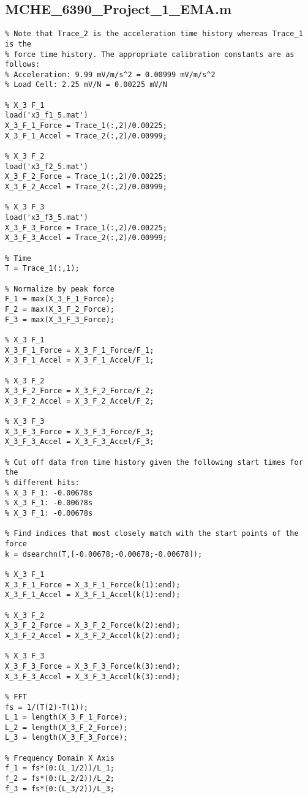 \documentclass{article}
\begin{document}
\subsection*{MCHE\_6390\_Project\_1\_EMA.m}
\begin{lstlisting}[style=Matlab-editor]
% Load data and apply proper calibration constants
% Note that Trace_2 is the acceleration time history whereas Trace_1 is the
% force time history. The appropriate calibration constants are as follows:
% Acceleration: 9.99 mV/m/s^2 = 0.00999 mV/m/s^2
% Load Cell: 2.25 mV/N = 0.00225 mV/N

% X_3 F_1
load('x3_f1_5.mat')
X_3_F_1_Force = Trace_1(:,2)/0.00225;
X_3_F_1_Accel = Trace_2(:,2)/0.00999;

% X_3 F_2
load('x3_f2_5.mat')
X_3_F_2_Force = Trace_1(:,2)/0.00225;
X_3_F_2_Accel = Trace_2(:,2)/0.00999;

% X_3 F_3
load('x3_f3_5.mat')
X_3_F_3_Force = Trace_1(:,2)/0.00225;
X_3_F_3_Accel = Trace_2(:,2)/0.00999;

% Time
T = Trace_1(:,1);

% Normalize by peak force
F_1 = max(X_3_F_1_Force);
F_2 = max(X_3_F_2_Force);
F_3 = max(X_3_F_3_Force);

% X_3 F_1
X_3_F_1_Force = X_3_F_1_Force/F_1;
X_3_F_1_Accel = X_3_F_1_Accel/F_1;

% X_3 F_2
X_3_F_2_Force = X_3_F_2_Force/F_2;
X_3_F_2_Accel = X_3_F_2_Accel/F_2;

% X_3 F_3
X_3_F_3_Force = X_3_F_3_Force/F_3;
X_3_F_3_Accel = X_3_F_3_Accel/F_3;

% Cut off data from time history given the following start times for the
% different hits:
% X_3 F_1: -0.00678s
% X_3 F_1: -0.00678s
% X_3 F_1: -0.00678s

% Find indices that most closely match with the start points of the force
k = dsearchn(T,[-0.00678;-0.00678;-0.00678]);

% X_3 F_1
X_3_F_1_Force = X_3_F_1_Force(k(1):end);
X_3_F_1_Accel = X_3_F_1_Accel(k(1):end);

% X_3 F_2
X_3_F_2_Force = X_3_F_2_Force(k(2):end);
X_3_F_2_Accel = X_3_F_2_Accel(k(2):end);

% X_3 F_3
X_3_F_3_Force = X_3_F_3_Force(k(3):end);
X_3_F_3_Accel = X_3_F_3_Accel(k(3):end);

% FFT
fs = 1/(T(2)-T(1));
L_1 = length(X_3_F_1_Force);
L_2 = length(X_3_F_2_Force);
L_3 = length(X_3_F_3_Force);

% Frequency Domain X Axis
f_1 = fs*(0:(L_1/2))/L_1;
f_2 = fs*(0:(L_2/2))/L_2;
f_3 = fs*(0:(L_3/2))/L_3;


\end{lstlisting}
\end{document}
